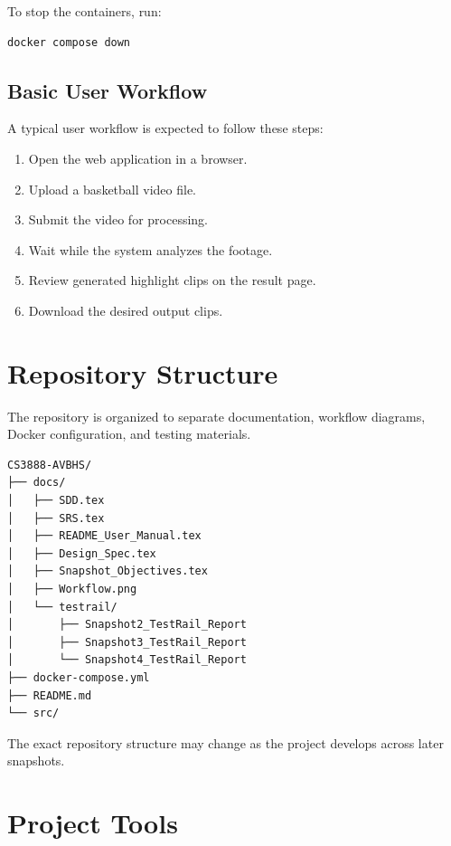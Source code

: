 \documentclass[12pt]{article}
\begin{document}
To stop the containers, run:

\begin{verbatim}
docker compose down
\end{verbatim}

\subsection{Basic User Workflow}
A typical user workflow is expected to follow these steps:

\begin{enumerate}[noitemsep]
    \item Open the web application in a browser.
    \item Upload a basketball video file.
    \item Submit the video for processing.
    \item Wait while the system analyzes the footage.
    \item Review generated highlight clips on the result page.
    \item Download the desired output clips.
\end{enumerate}

\section{Repository Structure}

The repository is organized to separate documentation, workflow diagrams, Docker configuration, and testing materials.

\begin{verbatim}
CS3888-AVBHS/
├── docs/
│   ├── SDD.tex
│   ├── SRS.tex
│   ├── README_User_Manual.tex
│   ├── Design_Spec.tex
│   ├── Snapshot_Objectives.tex
│   ├── Workflow.png
│   └── testrail/
│       ├── Snapshot2_TestRail_Report
│       ├── Snapshot3_TestRail_Report
│       └── Snapshot4_TestRail_Report
├── docker-compose.yml
├── README.md
└── src/
\end{verbatim}

The exact repository structure may change as the project develops across later snapshots.

\section{Project Tools}
\end{document}
